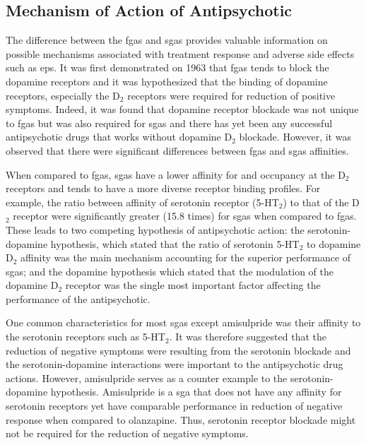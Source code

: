 	\subsection{Mechanism of Action of Antipsychotic}
	The difference between the \glspl{fga} and \glspl{sga} provides valuable information on possible mechanisms associated with treatment response and adverse side effects such as \gls{eps}.
	It was first demonstrated on 1963 that \glspl{fga} tends to block the dopamine receptors\citep{Lehmann1997} and it was hypothesized that the binding of dopamine receptors, especially the D$_2$ receptors were required for reduction of positive symptoms\citep{Arranz2007}. 
	Indeed, it was found that dopamine receptor blockade was not unique to \glspl{fga} but was also required for \glspl{sga} and there has yet been any successful antipsychotic drugs that works without dopamine D$_2$ blockade\citep{Zhang2011}.
	However, it was observed that there were significant differences between \glspl{fga} and \glspl{sga} affinities. 

	When compared to \glspl{fga}, \glspl{sga} have a lower affinity for and occupancy at the D$_2$ receptors and tends to have a more diverse receptor binding profiles.
	For example, the ratio between affinity of serotonin receptor (5-HT$_2$) to that of the D$_2$ receptor were significantly greater (15.8 times) for \glspl{sga} when compared to \glspl{fga}\citep{Meltzer1991}.
	These leads to two competing hypothesis of antipsychotic action: 
	the serotonin-dopamine hypothesis, which stated that the ratio of serotonin 5-HT$_2$ to dopamine D$_2$ affinity was the main mechanism accounting for the superior performance of \glspl{sga};
	and the dopamine hypothesis which stated that the modulation of the dopamine D$_2$ receptor was the single most important factor affecting the performance of the antipsychotic\citep{Kapur2003}.
	
	One common characteristics for most \glspl{sga} except amisulpride was their affinity to the serotonin receptors such as 5-HT$_2$. 
	It was therefore suggested that the reduction of negative symptoms were resulting from the serotonin blockade and the serotonin-dopamine interactions were important to the antipsychotic drug actions\citep{Meltzer1999}.
	However, amisulpride serves as a counter example to the serotonin-dopamine hypothesis.
	Amisulpride is a \gls{sga} that does not have any affinity for serotonin receptors yet have comparable performance in reduction of negative response when compared to olanzapine\citep{Kumar2014}.
	Thus, serotonin receptor blockade might not be required for the reduction of negative symptoms.
	
